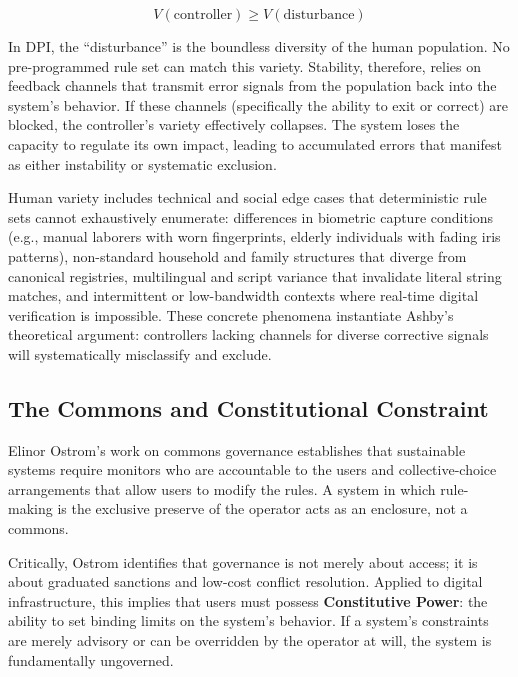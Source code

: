 \documentclass{article}
\begin{document}
\begin{equation}
V(\text{controller}) \geq V(\text{disturbance})
\label{eq:ashby}
\end{equation}

In DPI, the ``disturbance'' is the boundless diversity of the human population. No pre-programmed rule set can match this variety. Stability, therefore, relies on feedback channels that transmit error signals from the population back into the system's behavior. If these channels (specifically the ability to exit or correct) are blocked, the controller's variety effectively collapses. The system loses the capacity to regulate its own impact, leading to accumulated errors that manifest as either instability or systematic exclusion.

Human variety includes technical and social edge cases that deterministic rule sets cannot exhaustively enumerate: differences in biometric capture conditions (e.g., manual laborers with worn fingerprints, elderly individuals with fading iris patterns), non-standard household and family structures that diverge from canonical registries, multilingual and script variance that invalidate literal string matches, and intermittent or low-bandwidth contexts where real-time digital verification is impossible. These concrete phenomena instantiate Ashby's theoretical argument: controllers lacking channels for diverse corrective signals will systematically misclassify and exclude.

\subsection{The Commons and Constitutional Constraint}

Elinor Ostrom's work on commons governance \citep{ostrom1990} establishes that sustainable systems require monitors who are accountable to the users and collective-choice arrangements that allow users to modify the rules. A system in which rule-making is the exclusive preserve of the operator acts as an enclosure, not a commons.

Critically, Ostrom identifies that governance is not merely about access; it is about graduated sanctions and low-cost conflict resolution. Applied to digital infrastructure, this implies that users must possess \textbf{Constitutive Power}: the ability to set binding limits on the system's behavior. If a system's constraints are merely advisory or can be overridden by the operator at will, the system is fundamentally ungoverned.
\end{document}
